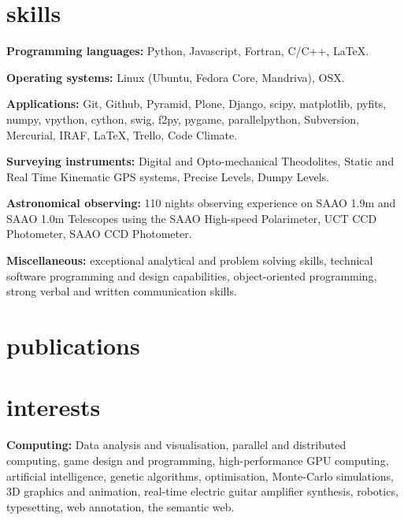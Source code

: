 \documentclass[]{friggeri-cv} %
\begin{document}

\section{skills}

\textbf{Programming languages:} Python, Javascript, Fortran, C/C++, \LaTeX.

\textbf{Operating systems:} Linux (Ubuntu, Fedora Core, Mandriva), OSX.

\textbf{Applications:} Git, Github, Pyramid, Plone, Django, scipy, matplotlib, pyfits, numpy, vpython, cython, swig, f2py, pygame, parallelpython, Subversion, Mercurial, IRAF, \LaTeX, Trello, Code Climate.

\textbf{Surveying instruments:} Digital and Opto-mechanical Theodolites, Static and Real Time Kinematic GPS
    systems, Precise Levels, Dumpy Levels.

\textbf{Astronomical observing:} 110 nights observing experience on SAAO 1.9m and SAAO 1.0m Telescopes using
     the SAAO High-speed Polarimeter, UCT CCD Photometer, SAAO CCD Photometer.

\textbf{Miscellaneous:} exceptional analytical and problem solving skills, technical software programming and design capabilities, object-oriented programming, strong verbal and written communication skills.


\section{publications}


\section{interests}

\textbf{Computing:} Data analysis and visualisation, parallel and distributed computing, game design and programming, high-performance GPU computing, artificial intelligence, genetic algorithms, optimisation, Monte-Carlo simulations, 3D graphics and animation, real-time electric guitar amplifier synthesis, robotics, typesetting, web annotation, the semantic web.
\end{document}
